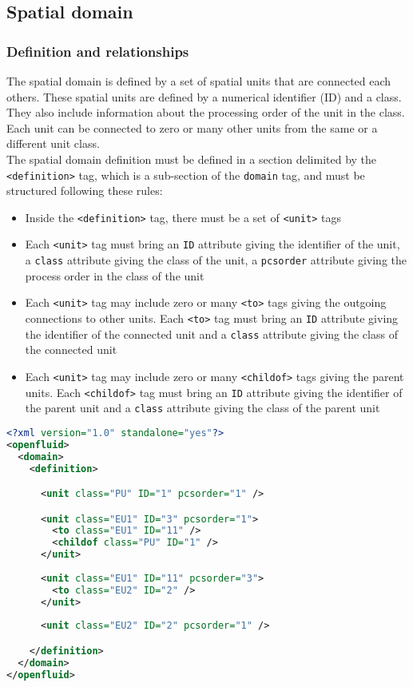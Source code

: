 \bigskip

\subsection{Spatial domain}

\subsubsection{Definition and relationships}

The spatial domain is defined by a set of spatial units that are connected each others.
These spatial units are defined by a numerical identifier (ID) and a class.
They also include information about the processing order of the unit in the class.
Each unit can be connected to zero or many other units from the same or a different unit class.\\
\noindent The spatial domain definition must be defined in a section delimited
by the \texttt{<definition>} tag, which is a sub-section of the \texttt{domain}
tag, and must be structured following these rules:
\begin{itemize}
  \item Inside the \texttt{<definition>} tag, there must be a set of
  \texttt{<unit>} tags
  \item Each \texttt{<unit>} tag must bring an \texttt{ID} attribute giving
  the identifier of the unit, a \texttt{class} attribute giving the class of
  the unit, a \texttt{pcsorder} attribute giving the process order in the
  class of the unit
  \item Each \texttt{<unit>} tag may include zero or many \texttt{<to>} tags giving
  the outgoing connections to other units. Each \texttt{<to>} tag must bring an
  \texttt{ID} attribute giving the identifier of the connected unit and a
  \texttt{class} attribute giving the class of the connected unit
  \item Each \texttt{<unit>} tag may include zero or many \texttt{<childof>}
  tags giving the parent units. Each \texttt{<childof>} tag must bring an
  \texttt{ID} attribute giving the identifier of the parent unit and a
  \texttt{class} attribute giving the class of the parent unit   
\end{itemize}

\begin{lstlisting}[language=xml,title=\footnotesize\textit{example}]
<?xml version="1.0" standalone="yes"?>
<openfluid>
  <domain>
    <definition>

      <unit class="PU" ID="1" pcsorder="1" />

      <unit class="EU1" ID="3" pcsorder="1">
        <to class="EU1" ID="11" />
        <childof class="PU" ID="1" />
      </unit>
      
      <unit class="EU1" ID="11" pcsorder="3">
        <to class="EU2" ID="2" />
      </unit>
      
      <unit class="EU2" ID="2" pcsorder="1" />

    </definition>
  </domain>
</openfluid>
\end{lstlisting}
\bigskip


